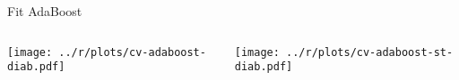 

\begin{frame}{Fit AdaBoost}




\begin{columns}[T]
\hspace{-2.3em}\begin{column}{0.515\textwidth}
	\texttt{[image: ../r/plots/cv-adaboost-diab.pdf]}
\end{column}
\hspace{-1.2ex}\begin{column}{0.515\textwidth}
	\texttt{[image: ../r/plots/cv-adaboost-st-diab.pdf]}
\end{column}
\end{columns}

\end{frame}


%
%

